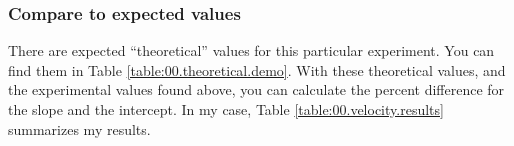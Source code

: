 \subsubsection{Compare to expected values}
There are expected ``theoretical'' values for this particular experiment. You can find them in Table \ref{table:00.theoretical.demo}. With these theoretical values, and the experimental values found above, you can calculate the percent difference for the slope and the intercept. In my case, Table \ref{table:00.velocity.results} summarizes my results.
\begin{center}
\end{center}
